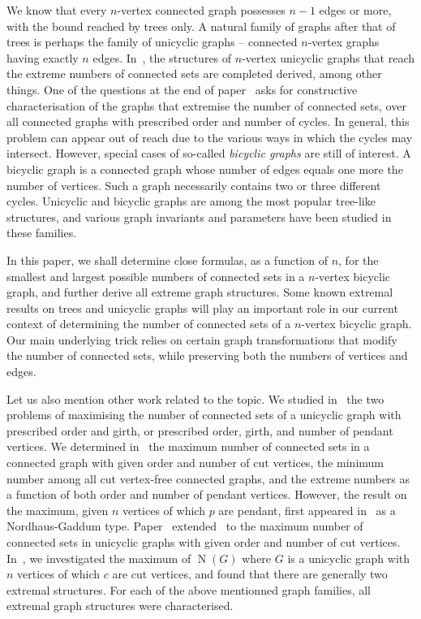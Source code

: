 \documentclass[a4paper,12pt]{amsart}
\theoremstyle{remark}
\DeclareMathOperator{\N}{N}
\begin{document}
\medskip
We know that every $n$-vertex connected graph possesses $n-1$ edges or more, with the bound reached by trees only. A natural family of graphs after that of trees is perhaps the family of unicyclic graphs -- connected $n$-vertex graphs having exactly $n$ edges. In~\cite{Audacegenral2018}, the structures of $n$-vertex unicyclic graphs that reach the extreme numbers of connected sets are completed derived, among other things. One of the questions at the end of paper~\cite{Audacegenral2018} asks for constructive characterisation of the graphs that extremise the number of connected sets, over all connected graphs with prescribed order and number of cycles. In general, this
problem can appear out of reach due to the various ways in which the
cycles may intersect. However, special cases of so-called \textit{bicyclic
graphs} are still of interest. A bicyclic graph is a connected graph whose number of edges equals one more the number of vertices. Such a graph necessarily contains two or three different cycles. Unicyclic and bicyclic graphs are among the most popular tree-like structures, and various graph invariants and parameters have been studied in these families.

In this paper, we shall determine close formulas, as a function of $n$, for the smallest and largest possible numbers of connected sets in a $n$-vertex bicyclic graph, and further derive all extreme graph structures. Some known extremal results on trees and unicyclic graphs will play an important role in our current context of determining the number of connected sets of a $n$-vertex bicyclic graph. Our main underlying trick relies on certain graph transformations that modify the number of connected sets, while preserving both the numbers of vertices and edges.

\medskip
Let us also mention other work related to the topic. We studied in~\cite{AudaceGirth2018} the two problems of maximising the number of connected sets of a unicyclic graph with prescribed order and girth, or prescribed order, girth, and number of pendant vertices. We determined in~\cite{AudaceCut2019} the maximum number of connected sets in a connected graph with given order and number of cut vertices, the minimum number among all cut vertex-free connected graphs, and the extreme numbers as a function of both order and number of pendant vertices. However, the result on the maximum, given $n$ vertices of which $p$ are pendant, first appeared in~\cite{Nordhauss} as a Nordhaus-Gaddum type. Paper~\cite{Audacegenral2018} extended~\cite{AudaceCut2019} to the maximum number of connected sets in unicyclic graphs with given order and number of cut vertices. In~\cite{AudTOUT}, we investigated the maximum of $\N(G)$ where $G$ is a unicyclic graph with $n$ vertices of which $c$ are cut vertices, and found that there are generally two extremal structures. For each of the above mentionned graph families, all extremal graph structures were characterised.
\end{document}
